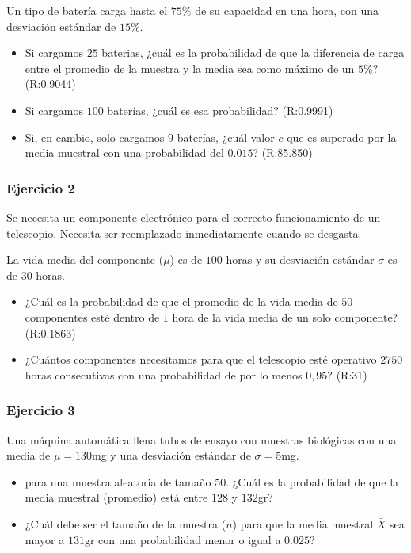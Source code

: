 \documentclass[
]{book}
\begin{document}
Un tipo de batería carga hasta el \(75\%\) de su capacidad en una hora, con una desviación estándar de \(15\%\).

\begin{itemize}
\item
  Si cargamos \(25\) baterias, ¿cuál es la probabilidad de que la diferencia de carga entre el promedio de la muestra y la media sea como máximo de un \(5\%\)? (R:0.9044)
\item
  Si cargamos \(100\) baterías, ¿cuál es esa probabilidad? (R:0.9991)
\item
  Si, en cambio, solo cargamos \(9\) baterías, ¿cuál valor \(c\) que es superado por la media muestral con una probabilidad del \(0.015\)? (R:85.850)
\end{itemize}

\hypertarget{ejercicio-2-5}{%
\subsubsection{Ejercicio 2}\label{ejercicio-2-5}}

Se necesita un componente electrónico para el correcto funcionamiento de un telescopio. Necesita ser reemplazado inmediatamente cuando se desgasta.

La vida media del componente (\(\mu\)) es de \(100\) horas y su desviación estándar \(\sigma\) es de \(30\) horas.

\begin{itemize}
\item
  ¿Cuál es la probabilidad de que el promedio de la vida media de \(50\) componentes esté dentro de \(1\) hora de la vida media de un solo componente? (R:0.1863)
\item
  ¿Cuántos componentes necesitamos para que el telescopio esté operativo \(2750\) horas consecutivas con una probabilidad de por lo menos \(0,95\)? (R:31)
\end{itemize}

\hypertarget{ejercicio-3-3}{%
\subsubsection{Ejercicio 3}\label{ejercicio-3-3}}

Una máquina automática llena tubos de ensayo con muestras biológicas con una media de \(\mu=130\)mg y una desviación estándar de \(\sigma=5\)mg.

\begin{itemize}
\item
  para una muestra aleatoria de tamaño \(50\). ¿Cuál es la probabilidad de que
  la media muestral (promedio) está entre \(128\) y \(132\)gr?
\item
  ¿Cuál debe ser el tamaño de la muestra (\(n\)) para que la media muestral \(\bar{X}\) sea mayor a \(131\)gr con una probabilidad menor o igual a \(0.025\)?
\end{itemize}
\end{document}
